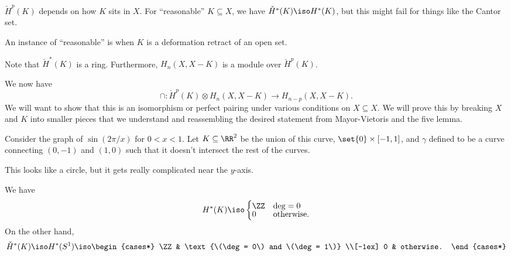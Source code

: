 \documentclass{standalone}
\begin{document}
\begin{remark}
  \(\check{H}^p(K)\) depends on how \(K\) sits in \(X\).
  For ``reasonable'' \(K \subseteq X\),
  we have \(\check{H}^*(K) \iso H^*(K)\),
  but this might fail for things like the Cantor set.

  An instance of ``reasonable'' is when \(K\) is
  a deformation retract of an open set.
\end{remark}

Note that \(\check{H}^*(K)\) is a ring.
Furthermore, \(H_n(X, X-K)\) is a module over \(\check{H}^p(K)\).

We now have
\[
  \cap \colon \check{H}^p(K) \otimes H_n(X, X-K) \to H_{n-p}(X, X-K).
\]
We will want to show that this is an isomorphism or perfect pairing
under various conditions on \(X \subseteq X\).
We will prove this by breaking \(X\) and \(K\) into smaller pieces
that we understand and reassembling the desired statement from Mayor-Vietoris
and the five lemma.

\begin{example}
  Consider the graph of \(\sin(2\pi / x)\) for \(0 < x < 1\).
  Let \(K \subseteq \RR^2\) be the union of
    this curve,
    \(\set{0} \times [-1, 1]\), and
    \(\gamma\) defined to be a curve connecting \((0, -1)\) and \((1, 0)\)
    such that it doesn't intersect the rest of the curves.

  This looks like a circle,
  but it gets really complicated near the \(y\)-axis.

  We have
  \[
    H^*(K) \iso \begin{cases}
      \ZZ & \deg = 0 \\[-1ex]
      0 & \text{otherwise}.
    \end{cases}
  \]
  On the other hand,
  \[
    \check H^*(K) \iso H^*(S^1) \iso \begin{cases*}
      \ZZ & \text{\(\deg = 0\) and \(\deg = 1\)} \\[-1ex]
      0 & otherwise.
    \end{cases*}
  \]
\end{example}
\end{document}
